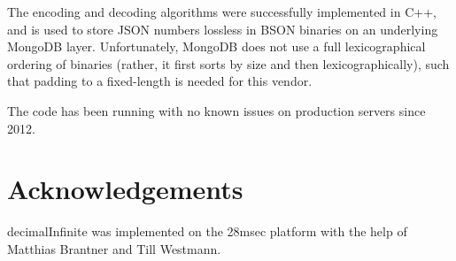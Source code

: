 \documentclass{acm_proc_article-sp}
\begin{document}
The encoding and decoding algorithms were successfully implemented in C++, and is used to store JSON numbers lossless in BSON binaries on an underlying MongoDB layer. Unfortunately, MongoDB does not use a full lexicographical ordering of binaries (rather, it first sorts by size and then lexicographically), such that padding to a fixed-length is needed for this vendor.

The code has been running with no known issues on production servers since 2012.

\section{Acknowledgements}
decimalInfinite was implemented on the 28msec platform with the help of Matthias Brantner and Till Westmann.



\end{document}
